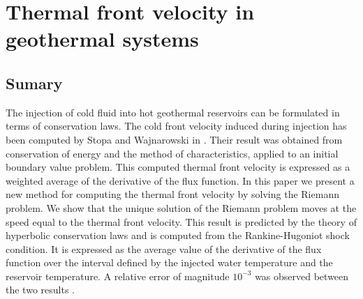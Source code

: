 
\chapter{Thermal front velocity in geothermal systems} %

\label{Chapter2} %


\section{Sumary}

The injection of cold fluid into hot geothermal reservoirs can be formulated in terms of conservation laws. The cold front velocity induced during injection has been computed by Stopa and Wajnarowski in \cite{Waj05}. Their result was obtained from conservation of energy and the method of characteristics, applied to an initial boundary value problem. This computed thermal front velocity is expressed as a weighted average of the derivative of the flux function. In this paper we present a new method for computing the thermal front velocity by solving the Riemann problem. We show that the unique solution of the Riemann problem moves at the speed equal to the thermal front velocity. This result is predicted by the theory of hyperbolic conservation laws and is computed from the Rankine-Hugoniot shock condition. It is expressed as the average value of the derivative of the flux function over the interval defined by the injected water temperature and the reservoir temperature. A relative error of magnitude $10^{-3}$ was observed between the two results .%

